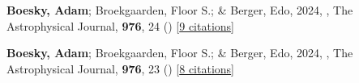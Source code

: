 \item[{\color{numcolor}\scriptsize2}] \textbf{Boesky, Adam}; Broekgaarden, Floor S.; \& Berger, Edo, 2024, , The Astrophysical Journal, \textbf{976}, 24 () [\href{https://ui.adsabs.harvard.edu/abs/2024ApJ...976...24B}{9 citations}]

\item[{\color{numcolor}\scriptsize1}] \textbf{Boesky, Adam}; Broekgaarden, Floor S.; \& Berger, Edo, 2024, , The Astrophysical Journal, \textbf{976}, 23 () [\href{https://ui.adsabs.harvard.edu/abs/2024ApJ...976...23B}{8 citations}]